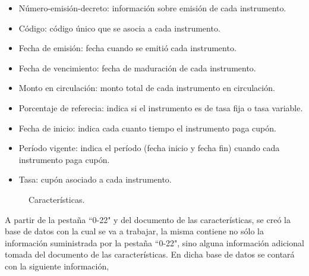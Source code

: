 \begin{itemize}
  \item N\'umero-emisi\'on-decreto: informaci\'on sobre emisi\'on de cada instrumento.
  \item C\'odigo: c\'odigo \'unico que se asocia a cada instrumento.
  \item Fecha de emisi\'on: fecha cuando se emiti\'o cada instrumento.
  \item Fecha de vencimiento: fecha de maduraci\'on de cada instrumento.
  \item Monto en circulaci\'on: monto total de cada instrumento en circulaci\'on.
  \item Porcentaje de referecia: indica si el instrumento es de tasa fija o tasa variable.
  \item Fecha de inicio: indica cada cuanto tiempo el instrumento paga cup\'on.
  \item Per\'iodo vigente: indica el per\'iodo (fecha inicio y fecha fin) cuando cada instrumento paga cup\'on.
  \item Tasa: cup\'on asociado a cada instrumento.
\end{itemize}



\begin{figure}[h]
\caption{Caracter\'isticas.}
\label{doc_carac}
\end{figure}


\hspace{0.4cm} A partir de la pesta\~na ``0-22"\hspace{0.01cm} y del documento de las caracter\'isticas, se cre\'o la base de datos con la cual se va a trabajar, la misma contiene no s\'olo la informaci\'on suministrada por la pesta\~na ``0-22", sino alguna informaci\'on adicional tomada del documento de las caracter\'isticas. En dicha base de datos se contar\'a con la siguiente informaci\'on,

\vspace{0.5cm}

